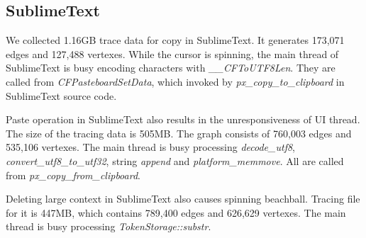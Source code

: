 \subsection{SublimeText}

We collected 1.16GB trace data for copy in SublimeText. It generates 173,071
edges and 127,488 vertexes. While the cursor is spinning, the main thread
of SublimeText is busy encoding characters with \textit{\_\_CFToUTF8Len}.
They are called from \textit{CFPasteboardSetData}, which invoked by
\textit{px\_copy\_to\_clipboard} in SublimeText source code.

Paste operation in SublimeText also results in the unresponsiveness of
UI thread. The size of the tracing data is 505MB. The graph consists of
760,003 edges and 535,106 vertexes. The main thread is busy processing
\textit{decode\_utf8}, \textit{convert\_utf8\_to\_utf32}, string
\textit{append} and \textit{platform\_memmove}. All are called from
\textit{px\_copy\_from\_clipboard}.

Deleting large context in SublimeText also causes spinning beachball. Tracing
file for it is 447MB, which contains 789,400 edges and 626,629 vertexes. The
main thread is busy processing \textit{TokenStorage::substr}.

